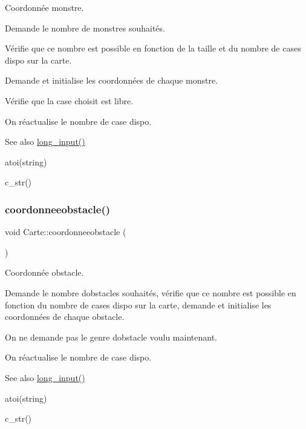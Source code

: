 Coordonnée monstre. 

Demande le nombre de monstres souhaités.

Vérifie que ce nombre est possible en fonction de la taille et du nombre de cases dispo sur la carte.

Demande et initialise les coordonnées de chaque monstre.

Vérifie que la case choisit est libre.

On réactualise le nombre de case dispo.

\begin{DoxySeeAlso}{See also}
\hyperlink{namespaceio_ab044be3afd7ac04eeb1a496af0f1d5c6}{long\+\_\+input()} 

atoi(string) 

c\+\_\+str() 
\end{DoxySeeAlso}
\mbox{\label{class_carte_a2a0ac8476d52a07b9cbcec0507df840d}} 
\subsubsection{\texorpdfstring{coordonneeobstacle()}{coordonneeobstacle()}}
{\footnotesize\ttfamily void Carte\+::coordonneeobstacle (\begin{DoxyParamCaption}{ }\end{DoxyParamCaption})}



Coordonnée obstacle. 

Demande le nombre d\textquotesingle{}obstacles souhaités, vérifie que ce nombre est possible en fonction du nombre de cases dispo sur la carte, demande et initialise les coordonnées de chaque obstacle.

On ne demande pas le genre d\textquotesingle{}obstacle voulu maintenant.

On réactualise le nombre de case dispo.

\begin{DoxySeeAlso}{See also}
\hyperlink{namespaceio_ab044be3afd7ac04eeb1a496af0f1d5c6}{long\+\_\+input()} 

atoi(string) 

c\+\_\+str() 
\end{DoxySeeAlso}
\mbox{\label{class_carte_aac7d187afdc3bf0ded53535c0d0b9ec0}} 
